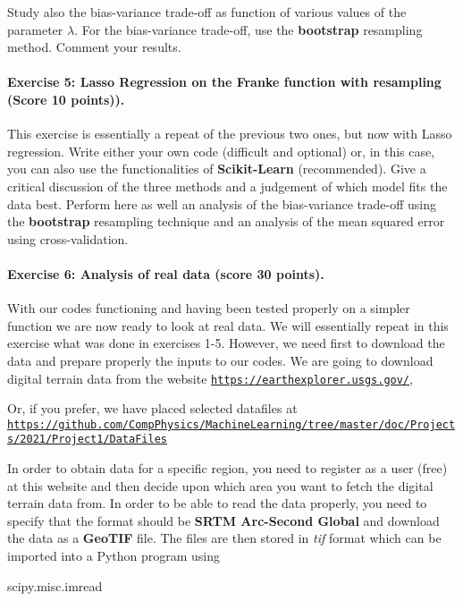 \documentclass[%
oneside,                 %
final,                   %
10pt]{article}
\begin{document}
Study also the bias-variance trade-off as function of various values of
the parameter $\lambda$. For the bias-variance trade-off, use the \textbf{bootstrap} resampling method. Comment your results. 

\paragraph{Exercise 5: Lasso Regression on the Franke function  with resampling (Score 10 points)).}
This exercise is essentially a repeat of the previous two ones, but now
with Lasso regression. Write either your own code (difficult and optional) or, in this case,
you can also use the functionalities of \textbf{Scikit-Learn} (recommended). 
Give a
critical discussion of the three methods and a judgement of which
model fits the data best.  Perform here as well an analysis of the bias-variance trade-off using the \textbf{bootstrap} resampling technique and an analysis of the mean squared error using cross-validation. 

\paragraph{Exercise 6: Analysis of real data  (score 30 points).}
With our codes functioning and having been tested properly on a
simpler function we are now ready to look at real data. We will
essentially repeat in this exercise what was done in exercises 1-5. However, we
need first to download the data and prepare properly the inputs to our
codes.  We are going to download digital terrain data from the website
\href{{https://earthexplorer.usgs.gov/}}{\nolinkurl{https://earthexplorer.usgs.gov/}},

Or, if you prefer, we have placed selected datafiles at \href{{https://github.com/CompPhysics/MachineLearning/tree/master/doc/Projects/2021/Project1/DataFiles}}{\nolinkurl{https://github.com/CompPhysics/MachineLearning/tree/master/doc/Projects/2021/Project1/DataFiles}}

In order to obtain data for a specific region, you need to register as
a user (free) at this website and then decide upon which area you want
to fetch the digital terrain data from.  In order to be able to read
the data properly, you need to specify that the format should be \textbf{SRTM
Arc-Second Global} and download the data as a \textbf{GeoTIF} file.  The
files are then stored in \emph{tif} format which can be imported into a
Python program using

\bpycod
scipy.misc.imread
\epycod
\end{document}
